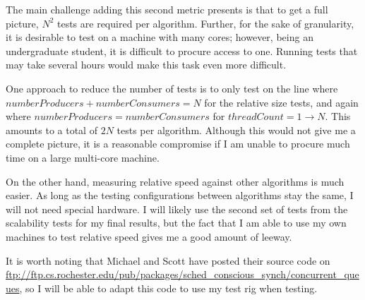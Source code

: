 \documentclass[12pt]{report}
\begin{document}
The main challenge adding this second metric presents is that to get a full
picture, $N^2$ tests are required per algorithm. Further, for the sake of
granularity, it is desirable to test on a machine with many cores; however,
being an undergraduate student, it is difficult to procure access to one.
Running tests that may take several hours would make this task even more
difficult.

One approach to reduce the number of tests is to only test on the line where
$numberProducers+numberConsumers=N$ for the relative size tests, and again
where $numberProducers=numberConsumers$ for $threadCount=1\to N$. This amounts
to a total of $2N$ tests per algorithm. Although this would not give me a
complete picture, it is a reasonable compromise if I am unable to procure much
time on a large multi-core machine.

On the other hand, measuring relative speed against other algorithms is much
easier. As long as the testing configurations between algorithms stay the same,
I will not need special hardware. I will likely use the second set of tests
from the scalability tests for my final results, but the fact that I am able to
use my own machines to test relative speed gives me a good amount of leeway.

It is worth noting that Michael and Scott have posted their source code on
\url{ftp://ftp.cs.rochester.edu/pub/packages/sched\_conscious\_synch/concurrent\_queues},
so I will be able to adapt this code to use my test rig when testing.



\end{document}
